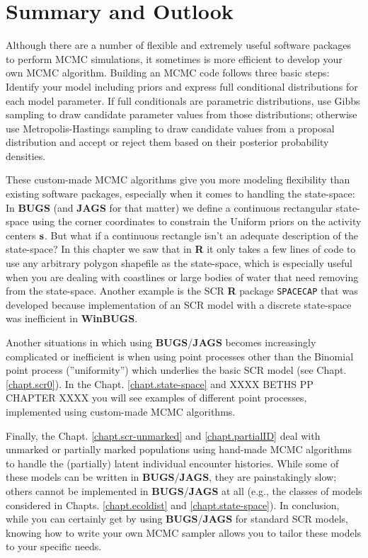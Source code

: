 \section{Summary and Outlook}

Although there are a number of flexible and extremely useful software 
packages to perform MCMC simulations, it sometimes is more efficient to 
develop your own MCMC algorithm. Building an MCMC code follows three basic 
steps: Identify your model including priors and express full conditional 
distributions for each model parameter. If full conditionals are parametric 
distributions, use Gibbs sampling to draw candidate parameter values from 
those distributions; otherwise use Metropolis-Hastings sampling to draw 
candidate values from a proposal distribution and accept or reject them 
based on their posterior probability densities.

These custom-made MCMC algorithms give you more modeling flexibility than 
existing software packages, especially when it comes to handling the
 state-space: In {\bf BUGS} (and {\bf JAGS} for that matter) we define
  a continuous rectangular state-space using the corner coordinates to 
  constrain the Uniform priors on the activity centers ${\bf s}$.
   But what if a continuous rectangle isn't an adequate description of 
   the state-space? In this chapter we saw that in {\bf R} it only takes 
   a few lines of code to use any arbitrary polygon shapefile as the 
   state-space, which is especially useful when you are dealing with 
   coastlines or large bodies of water that need removing from the 
   state-space. Another example is the SCR {\bf R} package \mbox{\tt SPACECAP}
    \citep{gopalaswamy_etal:2011} that was developed because implementation
     of an SCR model with a discrete state-space was inefficient in {\bf WinBUGS}.
     
Another situations in which using {\bf BUGS}/{\bf JAGS} becomes
increasingly
complicated or inefficient is when using point processes other 
than the 
 Binomial point process (''uniformity'') which underlies the basic 
 SCR model (see Chapt. \ref {chapt.scr0}). In the Chapt. 
 \ref {chapt.state-space} and XXXX BETHS PP CHAPTER XXXX you will see examples of different point processes,
  implemented using custom-made MCMC algorithms.

Finally, the Chapt. \ref {chapt.scr-unmarked} and \ref {chapt.partialID} deal with unmarked or 
partially marked populations using hand-made MCMC algorithms to 
handle the (partially) latent individual encounter histories. 
While some of these models can be written in {\bf BUGS}/{\bf JAGS}, they are painstakingly slow; others cannot be implemented in 
 {\bf BUGS}/{\bf JAGS} at all (e.g., the classes of models
 considered in Chapts. \ref{chapt.ecoldist} and  \ref{chapt.state-space}).
In conclusion, while you can certainly get by using {\bf BUGS}/{\bf JAGS} 
for standard SCR models, knowing how to write your own MCMC sampler 
allows you to tailor these models to your specific needs.

